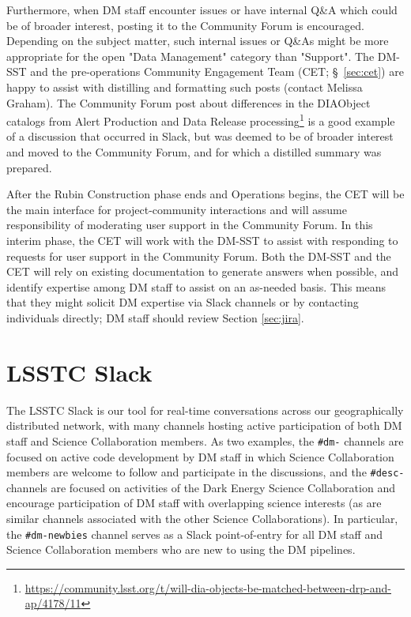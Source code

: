 \documentclass[DM,lsstdraft,authoryear,toc]{lsstdoc}
\begin{document}
Furthermore, when DM staff encounter issues or have internal Q\&A which could be of broader interest, posting it to the Community Forum is encouraged.
Depending on the subject matter, such internal issues or Q\&As might be more appropriate for the open "Data Management" category than "Support". 
The DM-SST and the pre-operations Community Engagement Team (CET; \S~\ref{sec:cet}) are happy to assist with distilling and formatting such posts (contact Melissa Graham).
The Community Forum post about differences in the DIAObject catalogs from Alert Production and Data Release processing\footnote{\url{https://community.lsst.org/t/will-dia-objects-be-matched-between-drp-and-ap/4178/11}} is a good example of a discussion that occurred in Slack, but was deemed to be of broader interest and moved to the Community Forum, and for which a distilled summary was prepared.

After the Rubin Construction phase ends and Operations begins, the CET will be the main interface for project-community interactions and will assume responsibility of moderating user support in the Community Forum.
In this interim phase, the CET will work with the DM-SST to assist with responding to requests for user support in the Community Forum.
Both the DM-SST and the CET will rely on existing documentation to generate answers when possible, and identify expertise among DM staff to assist on an as-needed basis.
This means that they might solicit DM expertise via Slack channels or by contacting individuals directly; DM staff should review Section \ref{sec:jira}.

\section{LSSTC Slack}\label{sec:slack}

The LSSTC Slack is our tool for real-time conversations across our geographically distributed network, with many channels hosting active participation of both DM staff and Science Collaboration members.
As two examples, the {\tt \#dm-} channels are focused on active code development by DM staff in which Science Collaboration members are welcome to follow and participate in the discussions, and the {\tt \#desc-} channels are focused on activities of the Dark Energy Science Collaboration and encourage participation of DM staff with overlapping science interests (as are similar channels associated with the other Science Collaborations).
In particular, the {\tt \#dm-newbies} channel serves as a Slack point-of-entry for all DM staff and Science Collaboration members who are new to using the DM pipelines.
\end{document}
